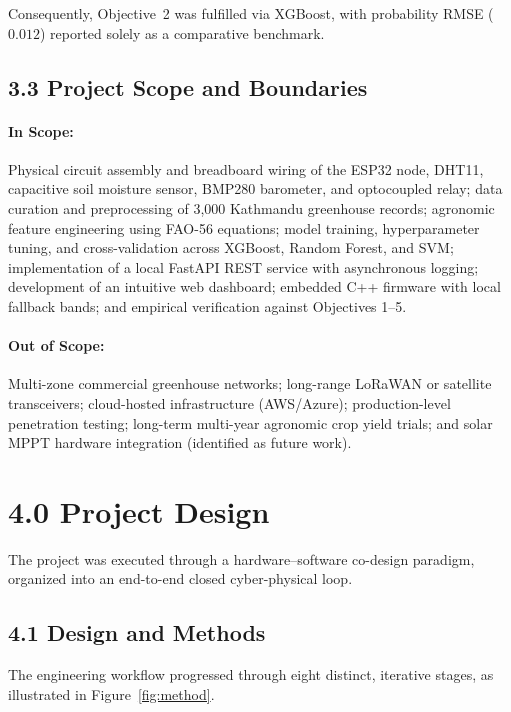 \documentclass[12pt, a4paper]{article}
\begin{document}
Consequently, Objective~2 was fulfilled via XGBoost, with probability RMSE ($0.012$) reported solely as a comparative benchmark.

\subsection{3.3 Project Scope and Boundaries}
\label{sec:scope}

\paragraph{In Scope:}
Physical circuit assembly and breadboard wiring of the ESP32 node, DHT11, capacitive soil moisture sensor, BMP280 barometer, and optocoupled relay; data curation and preprocessing of 3{,}000 Kathmandu greenhouse records; agronomic feature engineering using FAO-56 equations; model training, hyperparameter tuning, and cross-validation across XGBoost, Random Forest, and SVM; implementation of a local FastAPI REST service with asynchronous logging; development of an intuitive web dashboard; embedded C++ firmware with local fallback bands; and empirical verification against Objectives 1--5.

\paragraph{Out of Scope:}
Multi-zone commercial greenhouse networks; long-range LoRaWAN or satellite transceivers; cloud-hosted infrastructure (AWS/Azure); production-level penetration testing; long-term multi-year agronomic crop yield trials; and solar MPPT hardware integration (identified as future work).

\section{4.0 Project Design}
\label{sec:design}

The project was executed through a hardware--software co-design paradigm, organized into an end-to-end closed cyber-physical loop.

\subsection{4.1 Design and Methods}
\label{sec:methods}

The engineering workflow progressed through eight distinct, iterative stages, as illustrated in Figure~\ref{fig:method}.
\end{document}
